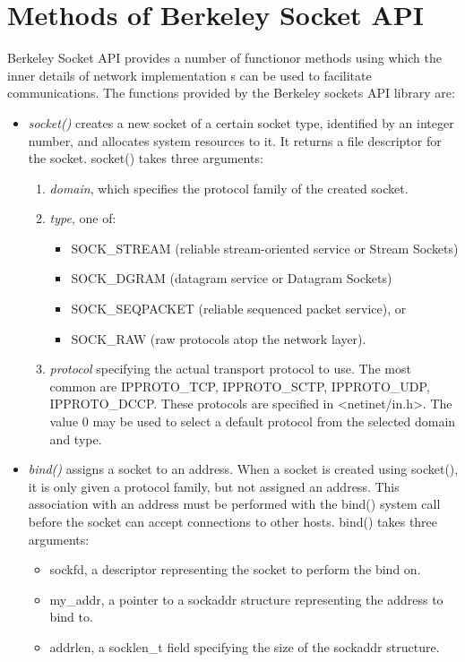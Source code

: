 \section{Methods of Berkeley Socket API}
Berkeley Socket API provides a number of functionor methods using which the inner details of network implementation s can be used to facilitate communications.
The functions provided by the Berkeley sockets API library are:
\begin{itemize}
	\item \textit{socket()} creates a new socket of a certain socket type, identified by an integer number, and allocates system resources to it.
	It returns a file descriptor for the socket. socket() takes three arguments:
	\begin{enumerate}
		\item \emph{domain}, which specifies the protocol family of the created socket.
		\item \emph{type}, one of:
		\begin{itemize}
			\item SOCK\_STREAM (reliable stream-oriented service or Stream Sockets)
			\item SOCK\_DGRAM (datagram service or Datagram Sockets)
			\item SOCK\_SEQPACKET (reliable sequenced packet service), or
			\item SOCK\_RAW (raw protocols atop the network layer).
		\end{itemize}
		\item \emph{protocol} specifying the actual transport protocol to use. The most common are IPPROTO\_TCP, IPPROTO\_SCTP, IPPROTO\_UDP, IPPROTO\_DCCP. These protocols are specified in <netinet/in.h>. The value 0 may be used to select a default protocol from the selected domain and type.
	\end{enumerate}
	\item \textit{bind()} assigns a socket to an address. When a socket is created using socket(), it is only given a protocol family, but not assigned an address. This association with an address must be performed with the bind() system call before the socket can accept connections to other hosts. bind() takes three arguments:
		\begin{itemize}
			\item sockfd, a descriptor representing the socket to perform the bind on.
			\item my\_addr, a pointer to a sockaddr structure representing the address to bind to.
			\item addrlen, a socklen\_t field specifying the size of the sockaddr structure.

\end{itemize}
\end{itemize}
